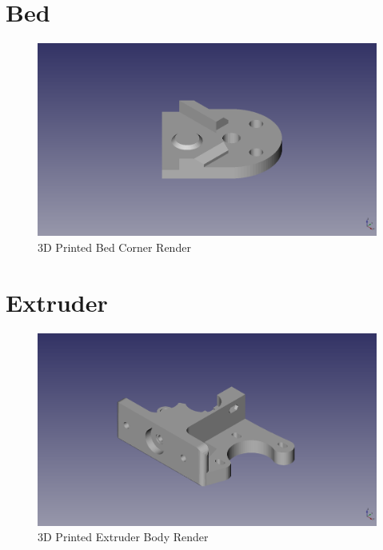 \section{Bed}
\begin{figure}[H]
\centering
\includegraphics[keepaspectratio=true,angle=0,height=1.0\textheight,width=1.0\textwidth]{STL/bedcorner.stl.png}
\caption{3D Printed Bed Corner Render}
\label{fig:bedcornerrender}
\end{figure}

\section{Extruder}
\begin{figure}[H]
\centering
\includegraphics[keepaspectratio=true,angle=0,height=1.0\textheight,width=1.0\textwidth]{STL/extruderbody.stl.png}
\caption{3D Printed Extruder Body Render}
\label{fig:extruderbodyrender}
\end{figure}

